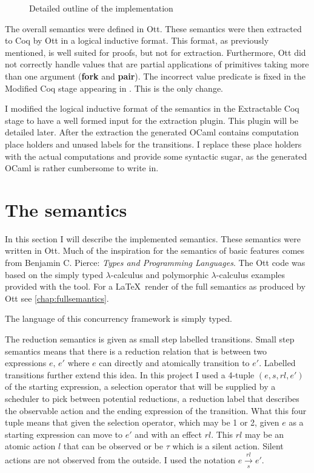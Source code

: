 \documentclass[12pt,twoside,notitlepage]{report}
\begin{document}
\begin{figure}[h]
\begin{center}
\caption{Detailed outline of the implementation}
\label{fig:detailedimploutline}
\end{center}
\end{figure}

The overall semantics were defined in Ott. These semantics were then extracted to Coq by Ott in a logical inductive format. This format, as previously mentioned, is well suited for proofs, but not for extraction. Furthermore, Ott did not correctly handle values that are partial applications of primitives taking more than one argument (\textbf{fork} and \textbf{pair}). The incorrect value predicate is fixed in the Modified Coq stage appearing in . This is the only change.

I modified the logical inductive format of the semantics in the Extractable Coq stage to have a well formed input for the extraction plugin. This plugin will be detailed later. After the extraction the generated OCaml contains computation place holders and unused labels for the transitions. I replace these place holders with the actual computations and provide some syntactic sugar, as the generated OCaml is rather cumbersome to write in.
\section{The semantics}
In this section I will describe the implemented semantics. These semantics were written in Ott. Much of the inspiration for the semantics of basic features comes from Benjamin C. Pierce: \textit{Types and Programming Languages}\cite{pierce2002types}. The Ott code was based on the simply typed $ \lambda $-calculus and polymorphic $ \lambda $-calculus examples provided with the tool\cite{Ott}. For a \LaTeX\, render of the full semantics as produced by Ott see \cref{chap:fullsemantics}.

The language of this concurrency framework is simply typed. 

The reduction semantics is given as small step labelled transitions. Small step semantics means that there is a reduction relation that is between two expressions $ e, \, e' $ where $ e $ can directly and atomically transition to $ e' $. Labelled transitions further extend this idea. In this project I used a 4-tuple $ (e, s, rl, e') $ of the starting expression, a selection operator that will be supplied by a scheduler to pick between potential reductions, a reduction label that describes the observable action and the ending expression of the transition. What this four tuple means that given the selection operator, which may be 1 or 2, given $ e $ as a starting expression can move to $ e' $ and with an effect $ rl $. This $ rl $ may be an atomic action $ l $ that can be observed or be $ \tau $ which is a silent action. Silent actions are not observed from the outside. I used the notation $ e \overset{rl}{\underset{s}{\longrightarrow}} e' $.
 
\end{document}
